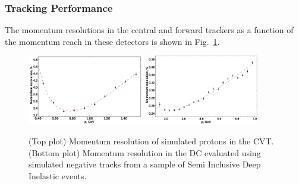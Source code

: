 \subsubsection{Tracking Performance}

The momentum resolutions in the central and forward trackers as a function of the momentum reach
in these detectors is shown in Fig.~\ref{fig:res}.

\begin{figure}
\includegraphics[width=0.45\textwidth]{pics/fddegipekmpjjiho.png}
\includegraphics[width=0.45\textwidth]{pics/DCRes.png}
\caption{(Top plot) Momentum resolution of simulated protons in the CVT.
(Bottom plot) Momentum resolution in the DC evaluated using simulated negative tracks from a sample of Semi Inclusive
Deep Inelastic events.
}
\label{fig:res}
\end{figure}
